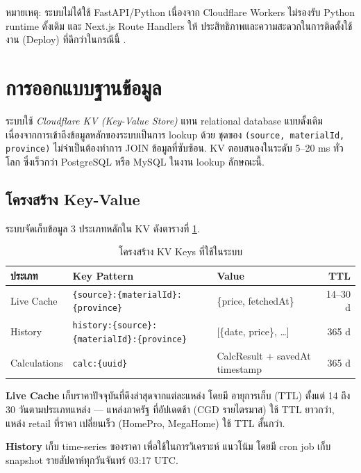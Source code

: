หมายเหตุ: ระบบไม่ได้ใช้ FastAPI/Python เนื่องจาก Cloudflare Workers
ไม่รองรับ Python runtime ดั้งเดิม และ Next.js Route Handlers ให้
ประสิทธิภาพและความสะดวกในการติดตั้งใช้งาน (Deploy) ที่ดีกว่าในกรณีนี้
\cite{cloudflare2025,nextjs2025}.

\section{การออกแบบฐานข้อมูล}
\label{sec:db-design}

ระบบใช้ \emph{Cloudflare KV (Key-Value Store)} แทน relational database
แบบดั้งเดิม เนื่องจากการเข้าถึงข้อมูลหลักของระบบเป็นการ lookup ด้วย
ชุดของ \texttt{(source, materialId, province)} ไม่จำเป็นต้องทำการ
JOIN ข้อมูลที่ซับซ้อน. KV ตอบสนองในระดับ 5--20 ms ทั่วโลก ซึ่งเร็วกว่า
PostgreSQL หรือ MySQL ในงาน lookup ลักษณะนี้.

\subsection{โครงสร้าง Key-Value}

ระบบจัดเก็บข้อมูล 3 ประเภทหลักใน KV ดังตารางที่ \ref{tab:kv-schema}.

\begin{table}[H]
\centering
\caption{โครงสร้าง KV Keys ที่ใช้ในระบบ}
\label{tab:kv-schema}
\begin{tabularx}{\textwidth}{l X X r}
\toprule
\textbf{ประเภท} & \textbf{Key Pattern} & \textbf{Value} & \textbf{TTL} \\
\midrule
Live Cache    & \texttt{\{source\}:\{materialId\}:\{province\}}              & \{price, fetchedAt\}            & 14--30 d \\
History       & \texttt{history:\{source\}:\{materialId\}:\{province\}}      & [\{date, price\}, \ldots]       & 365 d \\
Calculations  & \texttt{calc:\{uuid\}}                                       & CalcResult + savedAt timestamp  & 365 d \\
\bottomrule
\end{tabularx}
\end{table}

\textbf{Live Cache} เก็บราคาปัจจุบันที่ดึงล่าสุดจากแต่ละแหล่ง โดยมี
อายุการเก็บ (TTL) ตั้งแต่ 14 ถึง 30 วันตามประเภทแหล่ง — แหล่งภาครัฐ
ที่อัปเดตช้า (CGD รายไตรมาส) ใช้ TTL ยาวกว่า, แหล่ง retail ที่ราคา
เปลี่ยนเร็ว (HomePro, MegaHome) ใช้ TTL สั้นกว่า.

\textbf{History} เก็บ time-series ของราคา เพื่อใช้ในการวิเคราะห์
แนวโน้ม โดยมี cron job เก็บ snapshot รายสัปดาห์ทุกวันจันทร์ 03:17 UTC.

